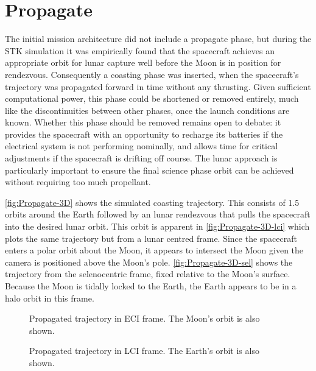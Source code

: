 
\clearpage 

\section{Propagate} \label{sec:Propagate}

The initial mission architecture did not include a propagate phase, but during the STK simulation it was empirically found that the spacecraft achieves an appropriate orbit for lunar capture well before the Moon is in position for rendezvous. Consequently a coasting phase was inserted, when the spacecraft's trajectory was propagated forward in time without any thrusting. Given sufficient computational power, this phase could be shortened or removed entirely, much like the discontinuities between other phases, once the launch conditions are known. Whether this phase should be removed remains open to debate: it provides the spacecraft with an opportunity to recharge its batteries if the electrical system is not performing nominally, and allows time for critical adjustments if the spacecraft is drifting off course. The lunar approach is particularly important to ensure the final science phase orbit can be achieved without requiring too much propellant.

\autoref{fig:Propagate-3D} shows the simulated coasting trajectory. This consists of 1.5 orbits around the Earth followed by an lunar rendezvous that pulls the spacecraft into the desired lunar orbit. This orbit is apparent in \autoref{fig:Propagate-3D-lci} which plots the same trajectory but from a lunar centred frame. Since the spacecraft enters a polar orbit about the Moon, it appears to intersect the Moon given the camera is positioned above the Moon's pole. \autoref{fig:Propagate-3D-sel} shows the trajectory from the selenocentric frame, fixed relative to the Moon's surface. Because the Moon is tidally locked to the Earth, the Earth appears to be in a halo orbit in this frame.

\begin{figure}
\centering
\def\svgwidth{\figurewidth}

\caption{Propagated trajectory in ECI frame. The Moon's orbit is also shown.}
\label{fig:Propagate-3D}
\end{figure}

\begin{figure}
\centering
\def\svgwidth{\figurewidth}

\caption{Propagated trajectory in LCI frame. The Earth's orbit is also shown.}
\label{fig:Propagate-3D-lci}
\end{figure}

